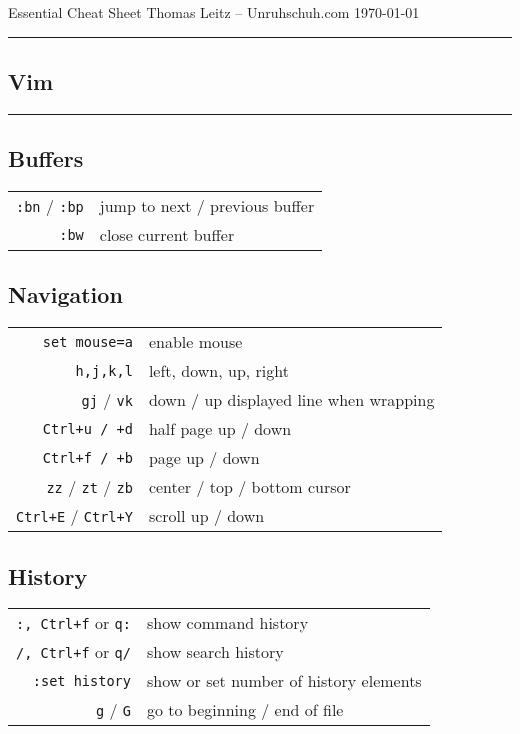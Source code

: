 

\usepackage{easy-todo}

\author{Thomas Leitz (Unruhschuh.com)}
\date{\today}



\raggedcolumns

Essential Cheat Sheet\hfill
Thomas Leitz -- Unruhschuh.com\hfill
\today
\hrule
\vspace*{2pt}

\begin{multicols*}{3}
  

\centering

\section{Vim}
\hrule\vspace*{2pt}
\subsection{Buffers}
\begin{tabular}{@{}rl@{}}
    \verb|:bn| / \verb|:bp| & jump to next / previous buffer \\
    \verb|:bw| & close current buffer
\end{tabular}
\subsection{Navigation}
\begin{tabular}{@{}rl@{}}
    \verb|set mouse=a| & enable mouse \\
    \verb|h,j,k,l|     & left, down, up, right \\
    \verb|gj| / \verb|vk| & down / up displayed line when wrapping \\
    \verb|Ctrl+u / +d| & half page up / down \\
    \verb|Ctrl+f / +b| & page up / down \\
    \verb|zz| / \verb|zt| / \verb|zb| & center / top / bottom cursor \\
    \verb|Ctrl+E| / \verb|Ctrl+Y| & scroll up / down
\end{tabular}

\subsection{History}
\begin{tabular}{@{}rl@{}}
    \verb|:, Ctrl+f| or \verb|q:| & show command history \\
    \verb|/, Ctrl+f| or \verb|q/| & show search history \\
    \verb|:set history| & show or set number of history elements \\
    \verb|g| / \verb|G| & go to beginning / end of file
\end{tabular}


\end{multicols*}
